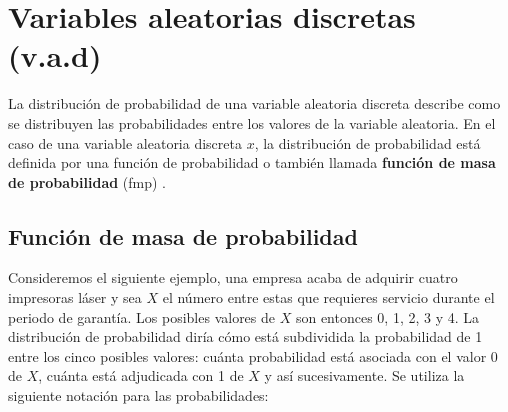 \documentclass[
]{book}
\theoremstyle{definition}
\theoremstyle{definition}
\theoremstyle{definition}
\theoremstyle{definition}
\theoremstyle{remark}
\begin{document}
\begin{table}[H]
\centering
{}
\end{table}

\hypertarget{variables-aleatorias-discretas-v.a.d}{%
\section{Variables aleatorias discretas (v.a.d)}\label{variables-aleatorias-discretas-v.a.d}}

La distribución de probabilidad de una variable aleatoria discreta describe como se distribuyen las probabilidades entre los valores de la variable aleatoria. En el caso de una variable aleatoria discreta \(x\), la distribución de probabilidad está definida por una función de probabilidad o también llamada \textbf{función de masa de probabilidad} (fmp) \citep[página 90]{Devore}.

\hypertarget{funciuxf3n-de-masa-de-probabilidad}{%
\subsection{Función de masa de probabilidad}\label{funciuxf3n-de-masa-de-probabilidad}}

Consideremos el siguiente ejemplo, una empresa acaba de adquirir cuatro impresoras láser y sea \(X\) el número entre estas que requieres servicio durante el periodo de garantía. Los posibles valores de \(X\) son entonces 0, 1, 2, 3 y 4. La distribución de probabilidad diría cómo está subdividida la probabilidad de 1 entre los cinco posibles valores: cuánta probabilidad está asociada con el valor 0 de \(X\), cuánta está adjudicada con 1 de \(X\) y así sucesivamente. Se utiliza la siguiente notación para las probabilidades:
\end{document}
